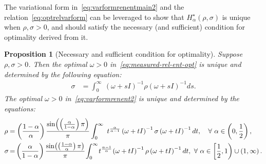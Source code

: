\documentclass[a4paper,onecolumn,11pt,accepted=2026-05-12]{quantumarticle}
\newtheorem{prop}[theorem]{Proposition}
\begin{document}
The variational form in~\eqref{eq:varformrenentmain2} and the relation~\eqref{eq:optrelvarform} can be leveraged to show that $H_{\alpha}^{\star}(\rho,\sigma)$ is unique when $\rho,\sigma>0$, and should satisfy the  necessary (and sufficient) condition for optimality derived from it.  \begin{prop}[Necessary and sufficient condition for optimality]
Suppose $\rho,\sigma>0$. 
Then the optimal $\omega>0$ in~\eqref{eq:measured-rel-ent-opt} is unique and determined by the following equation:
\begin{align}
\sigma & =\int_{0}^{\infty}\ \left(\omega+sI\right)^{-1}\rho\left(\omega+sI\right)^{-1}ds.\label{eq:opt-omega-measure-rel-ent}
\end{align}
The
optimal $\omega>0$ in~\eqref{eq:varformrenent2} is unique and determined by the equations:
\begin{align}
\rho & =\left(\frac{1-\alpha}{\alpha}\right)\frac{\sin\!\left(\left(\frac{\alpha}{1-\alpha}\right)\pi\right)}{\pi}\int_{0}^{\infty}\ t^{\frac{\alpha}{\alpha-1}}\left(\omega+tI\right)^{-1}\sigma\left(\omega+tI\right)^{-1}dt,~~~ \forall~ \alpha\in\left(0,\frac{1}{2}\right),\label{eq:optimal-omega-alpha-0-half} \\
\sigma \mspace{-2 mu}& =\mspace{-2 mu}\left(\frac{\alpha}{1-\alpha}\right)\frac{\sin\!\left(\left(\frac{1-\alpha}{\alpha}\right)\pi\right)}{\pi}\mspace{-2 mu}\int_{0}^{\infty}\mspace{-2 mu} t^{\frac{\alpha-1}{\alpha}}\mspace{-2 mu}\left(\omega+tI\right)^{-1}\rho\left(\omega+tI\right)^{-1}dt, ~ \forall~ \alpha\in\left[\frac{1}{2},1\right)\cup\left(1,\infty\right). \label{eq:optimal-omega-alpha-half-infty}
\end{align}
\end{prop}
\end{document}
